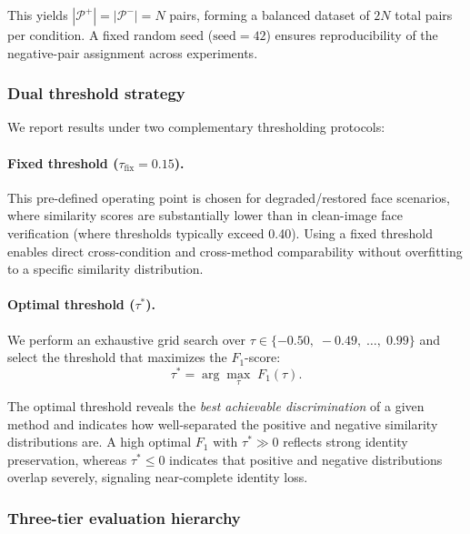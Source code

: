 \noindent
This yields $|\mathcal{P}^{+}| = |\mathcal{P}^{-}| = N$ pairs,
forming a balanced dataset of $2N$ total pairs per condition.
A fixed random seed ($\text{seed}=42$) ensures reproducibility of
the negative-pair assignment across experiments.

\subsubsection{Dual threshold strategy}
\label{subsubsec:threshold}

We report results under two complementary thresholding protocols:

\paragraph{Fixed threshold ($\tau_{\text{fix}} = 0.15$).}
This pre-defined operating point is chosen for degraded/restored
face scenarios, where similarity scores are substantially lower
than in clean-image face verification (where thresholds typically
exceed 0.40). Using a fixed threshold enables direct cross-condition
and cross-method comparability without overfitting to a specific
similarity distribution.

\paragraph{Optimal threshold ($\tau^{*}$).}
We perform an exhaustive grid search over
$\tau \in \{-0.50,\; -0.49,\; \dots,\; 0.99\}$ and select the threshold
that maximizes the $F_1$-score:
\begin{equation}
    \tau^{*} = \arg\max_{\tau} \; F_1(\tau).
    \label{eq:optimal_threshold}
\end{equation}

The optimal threshold reveals the \emph{best achievable discrimination}
of a given method and indicates how well-separated the positive and
negative similarity distributions are. A high optimal $F_1$ with
$\tau^{*} \gg 0$ reflects strong identity preservation, whereas
$\tau^{*} \leq 0$ indicates that positive and negative distributions
overlap severely, signaling near-complete identity loss.

\subsubsection{Three-tier evaluation hierarchy}
\label{subsubsec:tiers}

